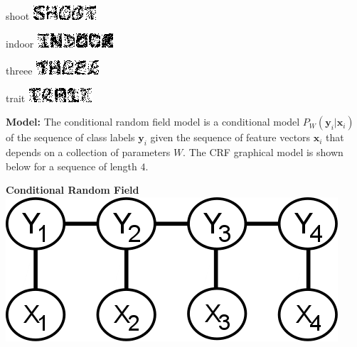 \documentclass[11pt]{article}
\newcommand{\mbf}[1]{{\mathbf{#1}}}
\begin{document}
\begin{center}
  \begin{minipage}[t]{1.4in}\centering
    shoot
    \includegraphics[scale=1]{images/train_img1.png}
  \end{minipage}
  \hspace{1em}
  \begin{minipage}[t]{1.4in}\centering
    indoor
    \includegraphics[scale=1]{images/train_img2.png}
  \end{minipage}
  \hspace{1em}
  \begin{minipage}[t]{1.4in}\centering
    threee
    \includegraphics[scale=1]{images/train_img3.png}
  \end{minipage}
  \hspace{1em}
  \begin{minipage}[t]{1.4in}\centering
    trait
    \includegraphics[scale=1]{images/train_img4.png}
  \end{minipage}
\end{center}



\textbf{Model:} The conditional random field model is a conditional model $P_W(\mbf{y}_i|\mbf{x}_i)$ of the sequence of class labels $\mbf{y}_i$ given the sequence of feature vectors $\mbf{x}_i$ that depends on a collection of parameters $W$. The CRF graphical 
model is shown below for a sequence of length $4$.\\

\begin{center}
    \centering
    \textbf{Conditional Random Field}\\\vspace{10pt}
    \includegraphics[scale=0.4]{crf.png}
\end{center}
\end{document}
